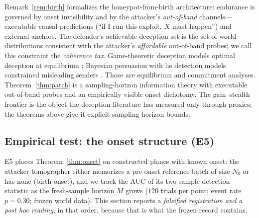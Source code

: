Remark~\ref{rem:birth} formalizes the honeypot-from-birth
architecture: endurance is governed by onset invisibility and by the
attacker's \emph{out-of-band} channels---executable causal predictions (``if
I run this exploit, $X$ must happen'') and external anchors. The defender's
achievable deception set is the set of world distributions consistent with
the attacker's \emph{affordable} out-of-band probes; we call this constraint
the \emph{coherence tax}. Game-theoretic deception models optimal deception
at equilibrium \cite{nguyen2019}; Bayesian persuasion with lie detection
models constrained misleading senders \cite{kamenica2011,nberlie}. Those are
equilibrium and commitment analyses. Theorem~\ref{thm:patch} is a
sampling-horizon information theory with executable out-of-band probes and
an empirically visible onset dichotomy. The gain--stealth frontier is the
object the deception literature has measured only through proxies; the
theorems above give it explicit sampling-horizon bounds.

\subsection{Empirical test: the onset structure (E5)}\label{sec:e5}

E5 places Theorem~\ref{thm:onset} on constructed planes with known onset:
the attacker-tomographer either memorizes a pre-onset reference batch of
size $N_0$ or has none (birth onset), and we track the AUC of its
two-sample detection statistic as the fresh-sample horizon $M$ grows ($120$
trials per point; event rate $p=0.30$; frozen world data). This section
reports a \emph{falsified registration and a post hoc reading}, in that
order, because that is what the frozen record contains.

